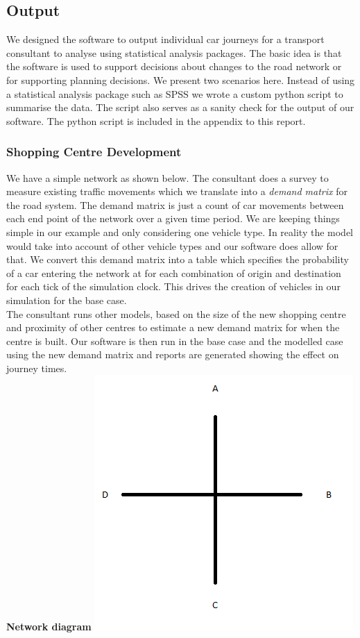 \subsection{Output}
We designed the software to output individual car journeys for a transport consultant to analyse using statistical analysis packages.  The basic idea is that the software is used to support decisions about  changes to the road network or for supporting planning decisions.  We present two scenarios here. Instead of using a statistical analysis package such as SPSS we wrote a custom python script to summarise the data.  The script also serves as a sanity check for the output of our software.  The python script is included in the appendix to this report. 



\subsubsection{Shopping Centre Development}
We have a simple network as shown below.  The consultant does a survey to measure existing traffic movements which we translate into a \textit{demand matrix} for the road system.  The demand matrix is just a count of car movements between each end point of the network over a given time period.  We are keeping things simple in our example and only considering one vehicle type.  In reality the model would take into account of other vehicle types and our software does allow for that.  We convert this demand matrix into a table which specifies the probability of a car entering the network at for each combination of origin and destination for each tick of the simulation clock.  This drives the creation of vehicles in our simulation for the base case.  \\ The consultant runs other models, based on the size of the new shopping centre and proximity of other centres to estimate a new demand matrix for when the centre is built.  Our software is then run in the base case and the modelled case using the new demand matrix and reports are generated showing the effect on journey times.\\ \textbf{Network diagram}
\includegraphics[scale=0.5]{./images/network.png}

